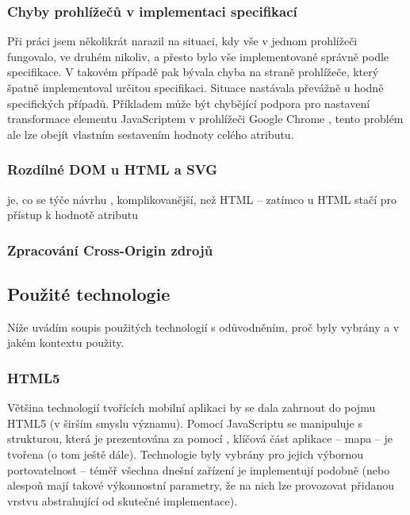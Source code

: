 \subsubsection{Chyby prohlížečů v implementaci specifikací}
Při práci jsem několikrát narazil na situaci, kdy vše v jednom prohlížeči fungovalo, ve druhém nikoliv, a přesto bylo vše implementované správně podle specifikace. V takovém případě pak bývala chyba na straně prohlížeče, který špatně implementoval určitou specifikaci. Situace nastávala převážně u hodně specifických případů. Příkladem může být chybějící podpora pro nastavení transformace  elementu JavaScriptem v prohlížeči Google Chrome \cite{BugChromeTran}, tento problém ale lze obejít vlastním sestavením hodnoty celého atributu. 

\subsubsection{Rozdílné DOM u HTML a SVG}
 je, co se týče návrhu , komplikovanější, než HTML -- zatímco u HTML stačí pro přístup k hodnotě atributu 

\subsubsection{Zpracování Cross-Origin zdrojů}
\label{sec:cross-origin}


\subsection{Použité technologie}
Níže uvádím soupis použitých technologií s odůvodněním, proč byly vybrány a v jakém kontextu použity.

\subsubsection{HTML5}
Většina technologií tvořících mobilní aplikaci by se dala zahrnout do pojmu HTML5 (v širším smyslu významu). Pomocí JavaScriptu se manipuluje s  strukturou, která je prezentována za pomocí , klíčová část aplikace -- mapa -- je tvořena  (o tom ještě dále). Technologie byly vybrány pro jejich výbornou portovatelnost -- téměř všechna dnešní zařízení je implementují podobně (nebo alespoň mají takové výkonnostní parametry, že na nich lze provozovat přidanou vrstvu abstrahující od skutečné implementace).

